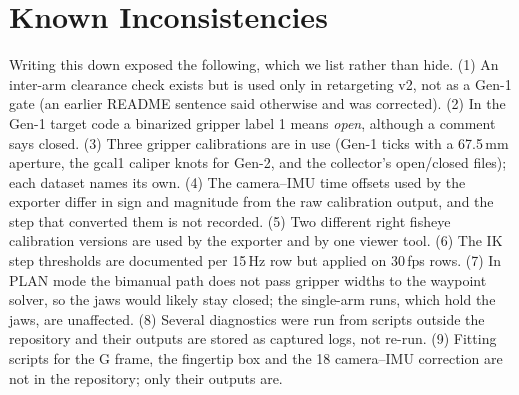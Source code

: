 \documentclass[conference,10pt]{IEEEtran}
\newcommand{\mm}{\,mm\xspace}
\begin{document}
\section{Known Inconsistencies}\label{m:sec:issues}
Writing this down exposed the following, which we list rather than hide. (1) An inter-arm clearance check exists but is used only in
retargeting v2, not as a Gen-1 gate (an earlier README sentence said otherwise and was corrected). (2) In the Gen-1 target code a
binarized gripper label 1 means \emph{open}, although a comment says closed. (3) Three gripper calibrations are in use (Gen-1 ticks with
a 67.5\mm{} aperture, the gcal1 caliper knots for Gen-2, and the collector's open/closed files); each dataset names its own. (4) The
camera--IMU time offsets used by the exporter differ in sign and magnitude from the raw calibration output, and the step that converted
them is not recorded. (5) Two different right fisheye calibration versions are used by the exporter and by one viewer tool. (6) The IK
step thresholds are documented per 15\,Hz row but applied on 30\,fps rows. (7) In PLAN mode the bimanual path does not pass gripper
widths to the waypoint solver, so the jaws would likely stay closed; the single-arm runs, which hold the jaws, are unaffected.
(8) Several diagnostics were run from scripts outside the repository and their outputs are stored as captured logs, not re-run.
(9) Fitting scripts for the G frame, the fingertip box and the 18\textdegree{} camera--IMU correction are not in the repository; only
their outputs are.
\clearpage\renewcommand{\refname}{References}
\label{part:refs}
\end{document}
